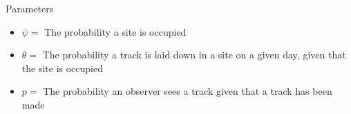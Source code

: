 \documentclass{beamer}
\begin{document}
\begin{frame}{Parameters}
	\begin{itemize}
		\item $\psi=$ The probability a site is occupied
		\item $\theta=$ The probability a track is laid down in a site on a
		given day, given that the site is occupied
		\item $p= $ The probability an observer sees a track given that a track
		has been made
	\end{itemize}
	\begin{center}
	\end{center}
\end{frame}
\end{document}
